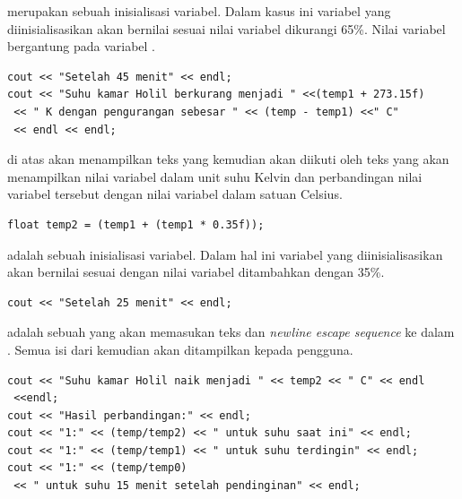 \documentclass[../main.tex]{subfiles}
\begin{document}
{\Script}  merupakan sebuah {\statement} inisialisasi variabel. Dalam kasus ini variabel yang diinisialisasikan akan bernilai sesuai nilai variabel  dikurangi 65\%. Nilai variabel  bergantung pada variabel .

\begin{code}
\begin{verbatim}
cout << "Setelah 45 menit" << endl;
cout << "Suhu kamar Holil berkurang menjadi " <<(temp1 + 273.15f)
 << " K dengan pengurangan sebesar " << (temp - temp1) <<" C"
 << endl << endl;
\end{verbatim}
\end{code}

{\Script} di atas akan menampilkan teks  yang kemudian akan diikuti oleh teks yang akan menampilkan nilai variabel  dalam unit suhu Kelvin dan perbandingan nilai variabel tersebut dengan nilai variabel  dalam satuan Celsius.

\begin{code}
\begin{verbatim}
float temp2 = (temp1 + (temp1 * 0.35f));
\end{verbatim}
\end{code}

{\Script}  adalah sebuah {\statement} inisialisasi variabel. Dalam hal ini variabel yang diinisialisasikan akan bernilai sesuai dengan nilai variabel  ditambahkan dengan 35\%.

\begin{code}
\begin{verbatim}
cout << "Setelah 25 menit" << endl;
\end{verbatim}
\end{code}

{\Script}  adalah sebuah {\statement} yang akan memasukan teks  dan \textit{newline escape sequence} ke dalam {\ioo} {\stream}. Semua isi dari {\ioo} {\stream} kemudian akan ditampilkan kepada pengguna.

\begin{code}
\begin{verbatim}
cout << "Suhu kamar Holil naik menjadi " << temp2 << " C" << endl 
 <<endl;
cout << "Hasil perbandingan:" << endl;
cout << "1:" << (temp/temp2) << " untuk suhu saat ini" << endl;
cout << "1:" << (temp/temp1) << " untuk suhu terdingin" << endl;
cout << "1:" << (temp/temp0)
 << " untuk suhu 15 menit setelah pendinginan" << endl;
\end{verbatim}
\end{code}
\end{document}

